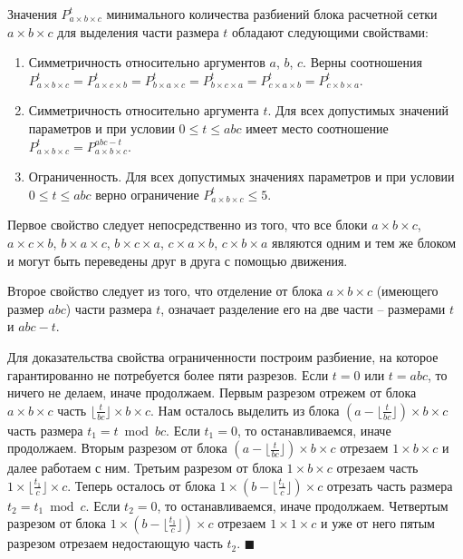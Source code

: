 \begin{lemma}\label{lem:par_pnmkt_properties}
Значения $P_{a \times b \times c}^t$ минимального количества разбиений блока расчетной сетки $a \times b \times c$ для выделения части размера $t$ обладают следующими свойствами:
\begin{enumerate}[noitemsep,topsep=0pt,parsep=0pt,partopsep=0pt]
\item Симметричность относительно аргументов $a$, $b$, $c$. Верны соотношения $P_{a \times b \times c}^t = P_{a \times c \times b}^t = P_{b \times a \times c}^t = P_{b \times c \times a}^t = P_{c \times a \times b}^t = P_{c \times b \times a}^t$. 
\item Симметричность относительно аргумента $t$. Для всех допустимых значений параметров и при условии $0 \le t \le abc$ имеет место соотношение $P_{a \times b \times c}^t = P_{a \times b \times c}^{abc - t}$.
\item Ограниченность. Для всех допустимых значениях параметров и при условии $0 \le t \le abc$ верно ограничение $P_{a \times b \times c}^t \le 5$.
\end{enumerate}
\end{lemma}

Первое свойство следует непосредственно из того, что все блоки $a \times b \times c$, $a \times c \times b$, $b \times a \times c$, $b \times c \times a$, $c \times a \times b$, $c \times b \times a$ являются одним и тем же блоком и могут быть переведены друг в друга с помощью движения.

Второе свойство следует из того, что отделение от блока $a \times b \times c$ (имеющего размер $abc$) части размера $t$, означает разделение его на две части -- размерами $t$ и $abc - t$.

Для доказательства свойства ограниченности построим разбиение, на которое гарантированно не потребуется более пяти разрезов.
Если $t = 0$ или $t = abc$, то ничего не делаем, иначе продолжаем.
Первым разрезом отрежем от блока $a \times b \times c$ часть $\lfloor \frac{t}{bc} \rfloor \times b \times c$.
Нам осталось выделить из блока $\left(a - \lfloor \frac{t}{bc} \rfloor\right) \times b \times c$ часть размера $t_1 = t \bmod bc$.
Если $t_1 = 0$, то останавливаемся, иначе продолжаем.
Вторым разрезом от блока $\left(a - \lfloor \frac{t}{bc} \rfloor\right) \times b \times c$ отрезаем $1 \times b \times c$ и далее работаем с ним.
Третьим разрезом от блока $1 \times b \times c$ отрезаем часть $1 \times \lfloor \frac{t_1}{c} \rfloor \times c$.
Теперь осталось от блока $1 \times \left( b - \lfloor \frac{t_1}{c} \rfloor \right) \times c$ отрезать часть размера $t_2 = t_1 \bmod c$.
Если $t_2 = 0$, то останавливаемся, иначе продолжаем.
Четвертым разрезом от блока $1 \times \left( b - \lfloor \frac{t_1}{c} \rfloor \right) \times c$ отрезаем $1 \times 1 \times c$ и уже от него пятым разрезом отрезаем недостающую часть $t_2$.
$\blacksquare$\\

